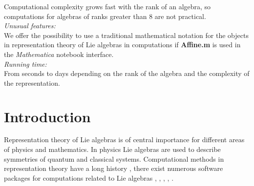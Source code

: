 \documentclass[preprint,12pt]{elsarticle}
\begin{document}
\begin{small}
Computational complexity grows fast  with the rank of an algebra, so computations for algebras of ranks greater than 8 are not practical.
   \\
{\em Unusual features:}\\
We offer the possibility to use a traditional mathematical notation for the objects in representation theory of Lie algebras in computations if {\bf Affine.m} is used in the {\it Mathematica} notebook interface.
   \\
{\em Running time:}\\
From seconds to days depending on the rank of the algebra and the complexity of the representation.
   \\

\end{small}


\section{Introduction}
\label{intro}

Representation theory of Lie algebras is of central importance for different areas of physics and mathematics. In physics Lie algebras are used to describe symmetries of quantum and classical systems. Computational methods in representation theory have a long history \cite{belinfante1989survey}, there exist numerous software packages for computations related to Lie algebras \cite{simplie}, \cite{vanleeuwen1994lsp}, \cite{stembridge1995mps,coxweyl}, \cite{fischbacher2002ilp}, \cite{Fuchs:1996dd}.
\end{document}
